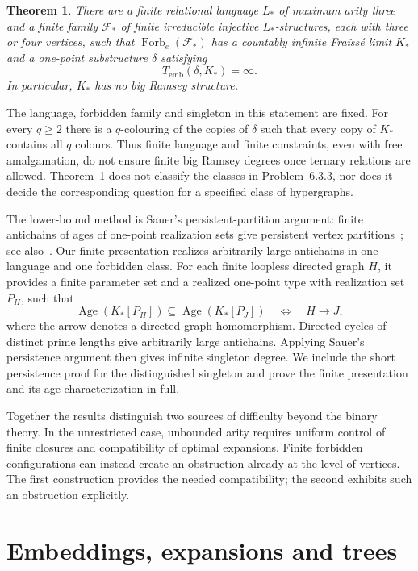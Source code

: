 \documentclass{article}
\numberwithin{equation}{section}
\newtheorem{theorem}{Theorem}[section]
\theoremstyle{definition}
\DeclareMathOperator{\Age}{Age}
\newcommand{\brd}{T_{\mathrm{emb}}}
\begin{document}
\begin{theorem}\label{thm:negative}
There are a finite relational language $L_*$ of maximum arity three and
a finite family $\mathcal F_*$ of finite irreducible injective
$L_*$-structures, each with three or four vertices, such that
$\operatorname{Forb}_e(\mathcal F_*)$ has a countably infinite
Fra\"iss\'e limit $K_*$ and a one-point substructure $\delta$ satisfying
\[
\brd(\delta,K_*)=\infty.
\]
In particular, $K_*$ has no big Ramsey structure.
\end{theorem}

The language, forbidden family and singleton in this statement are
fixed. For every $q\geq2$ there is a $q$-colouring of the copies of
$\delta$ such that every copy of $K_*$ contains all $q$ colours. Thus
finite language and finite constraints, even with free amalgamation,
do not ensure finite big Ramsey degrees once ternary relations are
allowed. Theorem~\ref{thm:negative} does not classify the classes in
Problem~6.3.3, nor does it decide the corresponding question for a
specified class of hypergraphs.

The lower-bound method is Sauer's persistent-partition argument:
finite antichains of ages of one-point realization sets give persistent
vertex partitions~\cite[Lemma~5.1 and Theorem~5.1]{SauerCanonicalVertex2003};
see also~\cite[Sections~1, 9 and~10]{SauerHomogeneous2020}.
Our finite presentation realizes arbitrarily large antichains in one
language and one forbidden class. For each finite loopless directed graph
$H$, it provides a finite parameter set and a realized one-point type
with realization set $P_H$, such that
\[
\Age(K_*[P_H])\subseteq\Age(K_*[P_J])
\quad\Longleftrightarrow\quad
H\longrightarrow J,
\]
where the arrow denotes a directed graph homomorphism. Directed cycles
of distinct prime lengths give arbitrarily large antichains. Applying
Sauer's persistence argument then gives infinite singleton degree. We
include the short persistence proof for the distinguished singleton and
prove the finite presentation and its age characterization in full.

Together the results distinguish two sources of difficulty beyond the
binary theory. In the unrestricted case, unbounded arity requires
uniform control of finite closures and compatibility of optimal
expansions. Finite forbidden configurations can instead create an
obstruction already at the level of vertices. The first construction
provides the needed compatibility; the second exhibits such an
obstruction explicitly.
\section{Embeddings, expansions and trees}\label{sec:prelim}
\end{document}
